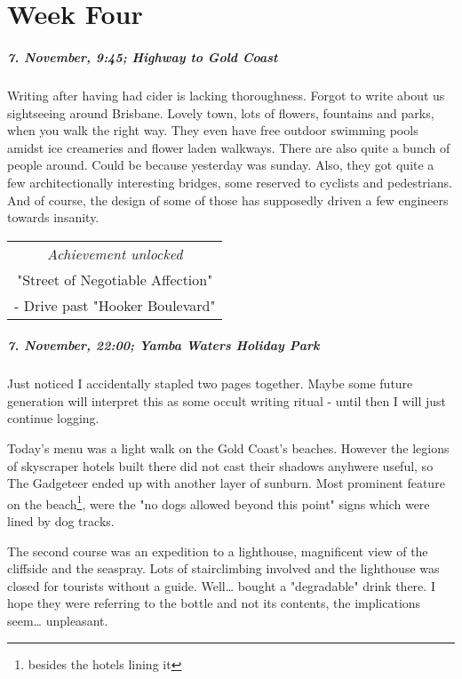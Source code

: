 \chapter{Week Four}


\paragraph{7. November, 9:45; Highway to Gold Coast}
Writing after having had cider is lacking thoroughness.
Forgot to write about us sightseeing around Brisbane.
Lovely town, lots of flowers, fountains and parks, when you walk the right way.
They even have free outdoor swimming pools amidst ice creameries and flower laden walkways.
There are also quite a bunch of people around.
Could be because yesterday was sunday.
Also, they got quite a few architectionally interesting bridges, some reserved to cyclists and pedestrians.
And of course, the design of some of those has supposedly driven a few engineers towards insanity.

\begin{center}
\begin{tabular}{||c||}
\emph{Achievement unlocked}\\
"Street of Negotiable Affection"\\
\multicolumn{1}{||p{0.8\textwidth}||}{\footnotesize - Drive past "Hooker Boulevard"} \\
\end{tabular}
\end{center}

\paragraph{7. November, 22:00; Yamba Waters Holiday Park}
Just noticed I accidentally stapled two pages together.
Maybe some future generation will interpret this as some occult writing ritual - until then I will just continue logging.

Today's menu was a light walk on the Gold Coast's beaches.
However the legions of skyscraper hotels built there did not cast their shadows anyhwere useful, so The Gadgeteer ended up with another layer of sunburn.
Most prominent feature on the beach\footnote{besides the hotels lining it}, were the "no dogs allowed beyond this point" signs which were lined by dog tracks.

The second course was an expedition to a lighthouse, magnificent view of the cliffside and the seaspray.
Lots of stairclimbing involved and the lighthouse was closed for tourists without a guide.
Well\ldots{} bought a "degradable" drink there.
I hope they were referring to the bottle and not its contents, the implications seem\ldots{} unpleasant.

